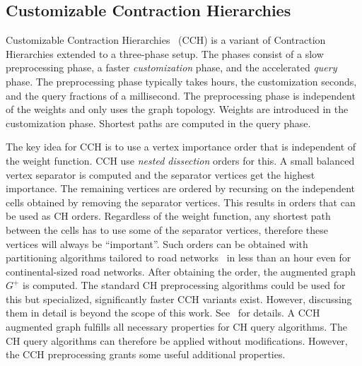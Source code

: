 \documentclass[manuscript,review]{acmart}
\begin{document}
\subsection{Customizable Contraction Hierarchies}
\label{sec:cch-intro}

Customizable Contraction Hierarchies~\cite{dsw-cch-15} (CCH) is a variant of Contraction Hierarchies extended to a three-phase setup.
The phases consist of a slow preprocessing phase, a faster \emph{customization} phase, and the accelerated \emph{query} phase.
The preprocessing phase typically takes hours, the customization seconds, and the query fractions of a millisecond.
The preprocessing phase is independent of the weights and only uses the graph topology.
Weights are introduced in the customization phase.
Shortest paths are computed in the query phase.

The key idea for CCH is to use a vertex importance order that is independent of the weight function.
CCH use \emph{nested dissection} orders for this.
A small balanced vertex separator is computed and the separator vertices get the highest importance.
The remaining vertices are ordered by recursing on the independent cells obtained by removing the separator vertices.
This results in orders that can be used as CH orders.
Regardless of the weight function, any shortest path between the cells has to use some of the separator vertices, therefore these vertices will always be ``important''.
Such orders can be obtained with partitioning algorithms tailored to road networks~\cite{GottesburenHUW19,hs-gbpo-18} in less than an hour even for continental-sized road networks.
After obtaining the order, the augmented graph $G^+$ is computed.
The standard CH preprocessing algorithms could be used for this but specialized, significantly faster CCH variants exist.
However, discussing them in detail is beyond the scope of this work.
See~\cite{dsw-cch-15,DBLP:journals/jea/Buchhold0W19} for details.
A CCH augmented graph fulfills all necessary properties for CH query algorithms.
The CH query algorithms can therefore be applied without modifications.
However, the CCH preprocessing grants some useful additional properties.
\end{document}
